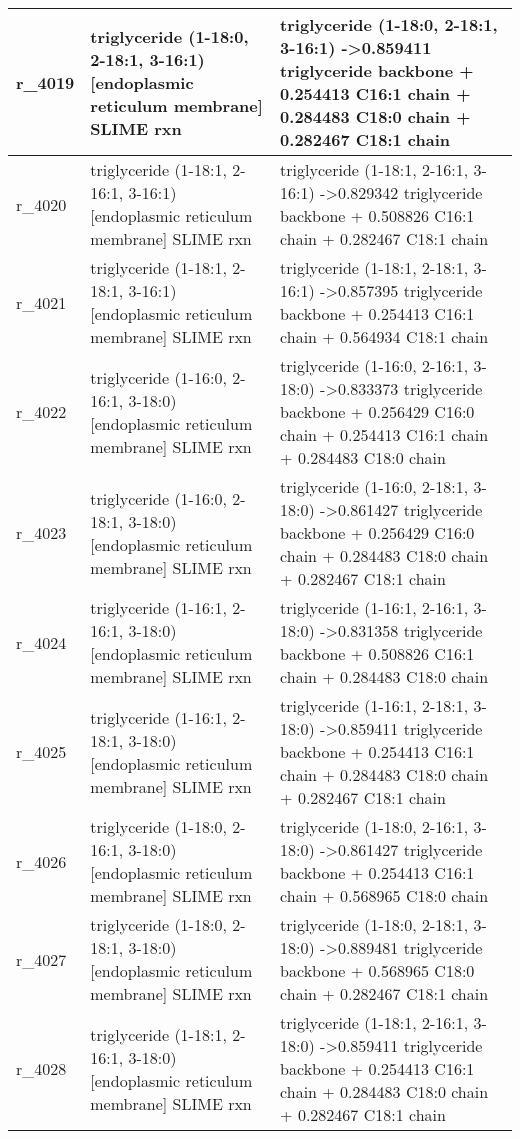 \begin{landscape}
{\begin{longtable}{|l|p{7cm}|p{15cm}|}
r\_4019 & triglyceride (1-18:0, 2-18:1, 3-16:1) {[}endoplasmic reticulum membrane{]} SLIME rxn & triglyceride (1-18:0, 2-18:1, 3-16:1)  -\textgreater 0.859411 triglyceride backbone + 0.254413 C16:1 chain + 0.284483 C18:0 chain + 0.282467 C18:1 chain \\ \hline
r\_4020 & triglyceride (1-18:1, 2-16:1, 3-16:1) {[}endoplasmic reticulum membrane{]} SLIME rxn & triglyceride (1-18:1, 2-16:1, 3-16:1)  -\textgreater 0.829342 triglyceride backbone + 0.508826 C16:1 chain + 0.282467 C18:1 chain \\ \hline
r\_4021 & triglyceride (1-18:1, 2-18:1, 3-16:1) {[}endoplasmic reticulum membrane{]} SLIME rxn & triglyceride (1-18:1, 2-18:1, 3-16:1)  -\textgreater 0.857395 triglyceride backbone + 0.254413 C16:1 chain + 0.564934 C18:1 chain \\ \hline
r\_4022 & triglyceride (1-16:0, 2-16:1, 3-18:0) {[}endoplasmic reticulum membrane{]} SLIME rxn & triglyceride (1-16:0, 2-16:1, 3-18:0)  -\textgreater 0.833373 triglyceride backbone + 0.256429 C16:0 chain + 0.254413 C16:1 chain + 0.284483 C18:0 chain \\ \hline
r\_4023 & triglyceride (1-16:0, 2-18:1, 3-18:0) {[}endoplasmic reticulum membrane{]} SLIME rxn & triglyceride (1-16:0, 2-18:1, 3-18:0)  -\textgreater 0.861427 triglyceride backbone + 0.256429 C16:0 chain + 0.284483 C18:0 chain + 0.282467 C18:1 chain \\ \hline
r\_4024 & triglyceride (1-16:1, 2-16:1, 3-18:0) {[}endoplasmic reticulum membrane{]} SLIME rxn & triglyceride (1-16:1, 2-16:1, 3-18:0)  -\textgreater 0.831358 triglyceride backbone + 0.508826 C16:1 chain + 0.284483 C18:0 chain \\ \hline
r\_4025 & triglyceride (1-16:1, 2-18:1, 3-18:0) {[}endoplasmic reticulum membrane{]} SLIME rxn & triglyceride (1-16:1, 2-18:1, 3-18:0)  -\textgreater 0.859411 triglyceride backbone + 0.254413 C16:1 chain + 0.284483 C18:0 chain + 0.282467 C18:1 chain \\ \hline
r\_4026 & triglyceride (1-18:0, 2-16:1, 3-18:0) {[}endoplasmic reticulum membrane{]} SLIME rxn & triglyceride (1-18:0, 2-16:1, 3-18:0)  -\textgreater 0.861427 triglyceride backbone + 0.254413 C16:1 chain + 0.568965 C18:0 chain \\ \hline
r\_4027 & triglyceride (1-18:0, 2-18:1, 3-18:0) {[}endoplasmic reticulum membrane{]} SLIME rxn & triglyceride (1-18:0, 2-18:1, 3-18:0)  -\textgreater 0.889481 triglyceride backbone + 0.568965 C18:0 chain + 0.282467 C18:1 chain \\ \hline
r\_4028 & triglyceride (1-18:1, 2-16:1, 3-18:0) {[}endoplasmic reticulum membrane{]} SLIME rxn & triglyceride (1-18:1, 2-16:1, 3-18:0)  -\textgreater 0.859411 triglyceride backbone + 0.254413 C16:1 chain + 0.284483 C18:0 chain + 0.282467 C18:1 chain \\ \hline

\end{longtable}}
\end{landscape}
